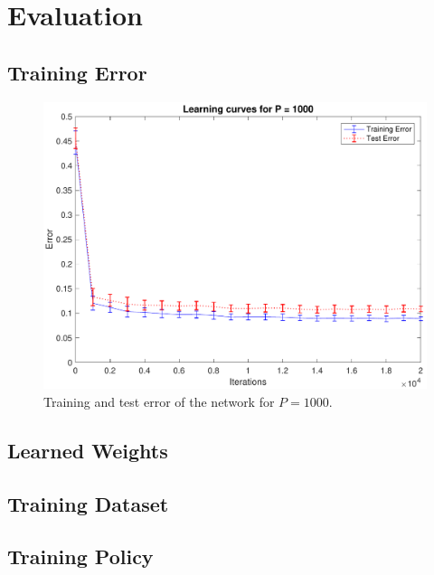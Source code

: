 \section{Evaluation}
\label{sec:evaluation}

\subsection{Training Error}
\begin{figure}[t]
	\centering
	\includegraphics[width=\columnwidth]{figures/error}
    \caption{Training and test error of the network for $P = 1000$.}
	\label{fig:training_error}
\end{figure}

\subsection{Learned Weights}

\subsection{Training Dataset}

\subsection{Training Policy}
